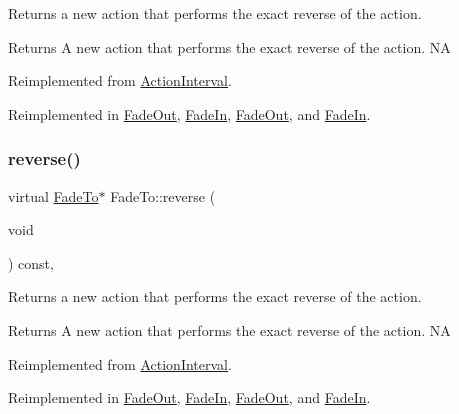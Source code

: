 Returns a new action that performs the exact reverse of the action.

\begin{DoxyReturn}{Returns}
A new action that performs the exact reverse of the action.  NA 
\end{DoxyReturn}


Reimplemented from \hyperlink{classActionInterval_a9f9ac7164036a0bc261a72f62a2b2da7}{Action\+Interval}.



Reimplemented in \hyperlink{classFadeOut_a18e27b1b9737d0f99604d683a1e185a8}{Fade\+Out}, \hyperlink{classFadeIn_a434301deede4fbe06674250b5d7809be}{Fade\+In}, \hyperlink{classFadeOut_aefa1585ac126946418ca92cb74b8a130}{Fade\+Out}, and \hyperlink{classFadeIn_a3c6c2fb763c9c394d37d2d699c482c3a}{Fade\+In}.

\mbox{\label{classFadeTo_ae67d300f60edd18e3e15863223d13040}} 
\subsubsection{\texorpdfstring{reverse()}{reverse()}\hspace{0.1cm}{\footnotesize\ttfamily [2/2]}}
{\footnotesize\ttfamily virtual \hyperlink{classFadeTo}{Fade\+To}$\ast$ Fade\+To\+::reverse (\begin{DoxyParamCaption}\item[{void}]{ }\end{DoxyParamCaption}) const\hspace{0.3cm}{\ttfamily [override]}, {\ttfamily [virtual]}}

Returns a new action that performs the exact reverse of the action.

\begin{DoxyReturn}{Returns}
A new action that performs the exact reverse of the action.  NA 
\end{DoxyReturn}


Reimplemented from \hyperlink{classActionInterval_a9f9ac7164036a0bc261a72f62a2b2da7}{Action\+Interval}.



Reimplemented in \hyperlink{classFadeOut_a18e27b1b9737d0f99604d683a1e185a8}{Fade\+Out}, \hyperlink{classFadeIn_a434301deede4fbe06674250b5d7809be}{Fade\+In}, \hyperlink{classFadeOut_aefa1585ac126946418ca92cb74b8a130}{Fade\+Out}, and \hyperlink{classFadeIn_a3c6c2fb763c9c394d37d2d699c482c3a}{Fade\+In}.

